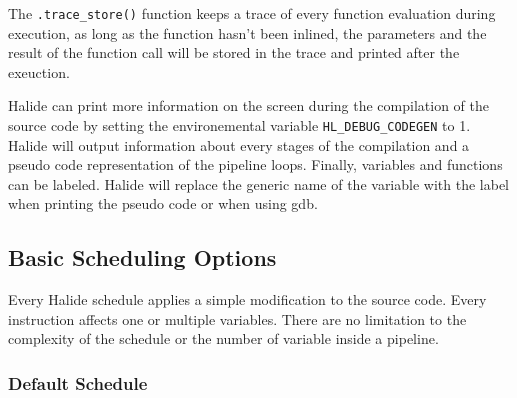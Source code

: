 	The  \verb|.trace_store()| function keeps a trace of every function evaluation during execution, as long as the function hasn't been inlined, the parameters and the result of the function call will be stored in the trace and printed after the exeuction.

	Halide can print more information on the screen during the compilation of the source code by setting the environemental variable \verb|HL_DEBUG_CODEGEN| to 1. Halide will output information about every stages of the compilation and a pseudo code representation of the pipeline loops. 
	Finally, variables and functions can be labeled. Halide will replace the generic name of the variable with the label when printing the pseudo code or when using gdb.

\subsection {Basic Scheduling Options}
	\label{section:scheduling}
	Every Halide schedule applies a simple modification to the source code. Every instruction affects one or multiple variables. There are no limitation to the complexity of the schedule or the number of variable inside a pipeline.

\newcommand\EIW{.4\textwidth}
\newcommand\ECW{\textwidth - \EIW}

	\subsubsection{Default Schedule}


